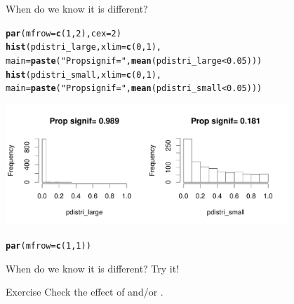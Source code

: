 \documentclass[10pt]{beamer}\usepackage[]{graphicx}\usepackage[]{color}
\makeatletter
\newcommand{\hlnum}[1]{\textcolor[rgb]{0.686,0.059,0.569}{#1}}%
\newcommand{\hlstr}[1]{\textcolor[rgb]{0.192,0.494,0.8}{#1}}%
\newcommand{\hlopt}[1]{\textcolor[rgb]{0,0,0}{#1}}%
\newcommand{\hlstd}[1]{\textcolor[rgb]{0.345,0.345,0.345}{#1}}%
\newcommand{\hlkwc}[1]{\textcolor[rgb]{0.333,0.667,0.333}{#1}}%
\newcommand{\hlkwd}[1]{\textcolor[rgb]{0.737,0.353,0.396}{\textbf{#1}}}%
\newenvironment{kframe}{%
 \def\at@end@of@kframe{}%
 \ifinner\ifhmode%
  \def\at@end@of@kframe{\end{minipage}}%
  \begin{minipage}{\columnwidth}%
 \fi\fi%
 \def\FrameCommand##1{\hskip\@totalleftmargin \hskip-\fboxsep
 \colorbox{shadecolor}{##1}\hskip-\fboxsep
     \hskip-\linewidth \hskip-\@totalleftmargin \hskip\columnwidth}%
 \MakeFramed {\advance\hsize-\width
   \@totalleftmargin\z@ \linewidth\hsize
   \@setminipage}}%
 {\par\unskip\endMakeFramed%
 \at@end@of@kframe}
\newenvironment{knitrout}{}{} %
\makeatother
\begin{document}
\begin{frame}[fragile]{When do we know it is different?}
\centering
\begin{knitrout}
\color{fgcolor}\begin{kframe}
\begin{alltt}
\hlkwd{par}\hlstd{(}\hlkwc{mfrow}\hlstd{=}\hlkwd{c}\hlstd{(}\hlnum{1}\hlstd{,}\hlnum{2}\hlstd{),} \hlkwc{cex}\hlstd{=}\hlnum{2}\hlstd{)}
\hlkwd{hist}\hlstd{(pdistri_large,} \hlkwc{xlim}\hlstd{=}\hlkwd{c}\hlstd{(}\hlnum{0}\hlstd{,}\hlnum{1}\hlstd{),}
     \hlkwc{main}\hlstd{=}\hlkwd{paste}\hlstd{(}\hlstr{"Prop signif="}\hlstd{,}\hlkwd{mean}\hlstd{(pdistri_large}\hlopt{<}\hlnum{0.05}\hlstd{)))}
\hlkwd{hist}\hlstd{(pdistri_small,} \hlkwc{xlim}\hlstd{=}\hlkwd{c}\hlstd{(}\hlnum{0}\hlstd{,}\hlnum{1}\hlstd{),}
     \hlkwc{main}\hlstd{=}\hlkwd{paste}\hlstd{(}\hlstr{"Prop signif="}\hlstd{,}\hlkwd{mean}\hlstd{(pdistri_small}\hlopt{<}\hlnum{0.05}\hlstd{)))}
\end{alltt}
\end{kframe}
\includegraphics[width=0.8\textwidth,height=0.5\textheight]{figure/comphist1-1} 
\begin{kframe}\begin{alltt}
\hlkwd{par}\hlstd{(}\hlkwc{mfrow}\hlstd{=}\hlkwd{c}\hlstd{(}\hlnum{1}\hlstd{,}\hlnum{1}\hlstd{))}
\end{alltt}
\end{kframe}
\end{knitrout}

\end{frame}

\begin{frame}[fragile]{When do we know it is different? Try it!}

\begin{alertblock}{Exercise}
Check the effect of {\color{orange}{smaller variability}} and/or {\color{blue}{larger sample size}}.
\end{alertblock}
\end{frame}
\end{document}
